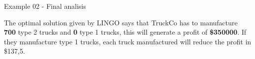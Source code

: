 \begin{frame}{Example 02 - Final analisis}

The optimal solution given by LINGO says that TruckCo has to manufacture
\textbf{700} type 2 trucks and \textbf{0} type 1 trucks, this will generate a
profit of \textbf{\$350000}. If they manufacture type 1 trucks, each truck
manufactured will reduce the profit in \$137,5.

\end{frame}
